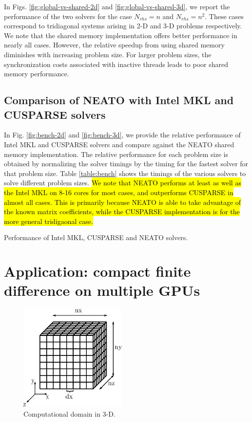 \documentclass{elsarticle}
\begin{document}
In Figs. \ref{fig:global-vs-shared-2d} and \ref{fig:global-vs-shared-3d},
we report the performance of the two solvers for the case
$N_{rhs} = n$ and $N_{rhs} = n^2$.
These cases correspond to tridiagonal systems
arising in 2-D and 3-D problems respectively.
We note that the shared memory implementation
offers better performance in nearly all cases.
However, the relative speedup from using
shared memory diminishes with increasing problem size.
For larger problem sizes,
the synchronization costs associated with inactive threads
leads to poor shared memory performance.

\subsection{Comparison of NEATO with Intel MKL and CUSPARSE solvers}

In Fig. \ref{fig:bench-2d} and \ref{fig:bench-3d},
we provide the relative performance of
Intel MKL and CUSPARSE solvers and compare against
the NEATO shared memory implementation.
The relative performance for
each problem size is obtained by
normalizing the solver timings
by the timing for the fastest solver for that problem size.
Table \ref{table:bench} shows the timings of the various
solvers to solve different problem sizes.
\hl{
We note that NEATO performs
at least as well as the Intel MKL on 8-16 cores
for most cases,
and outperforms CUSPARSE in almost all cases.
This is primarily because NEATO is able to take advantage
of the known matrix coefficients,
while the CUSPARSE implementation is for the more
general tridigaonal case.
}

\begin{table}
\scriptsize
\centering
\caption{Performance of Intel MKL, CUSPARSE and NEATO solvers.}
\label{table:bench}

\end{table}

\section{Application: compact finite difference on multiple GPUs}
\label{sec-compact-finite-differences}

\begin{figure}
\begin{center}
\includegraphics[height=150pt]{img/computational-domain.eps}
\caption{Computational domain in 3-D.}
\label{fig:computational-domain}
\end{center}
\end{figure}
\end{document}
